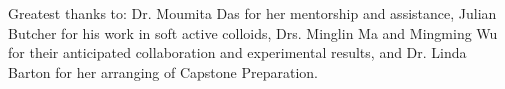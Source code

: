 \documentclass[aps,prb,twocolumn,groupedaddress,nofootinbib,floatfix]{revtex4}
\begin{document}
\begin{acknowledgments}
Greatest thanks to: Dr. Moumita Das for her mentorship and assistance, Julian Butcher for his work in soft active colloids, Drs. Minglin Ma and Mingming Wu for their anticipated collaboration and experimental results, and Dr. Linda Barton for her arranging of Capstone Preparation.
\end{acknowledgments}

\vspace{0.6in}
%
%



\end{document}
